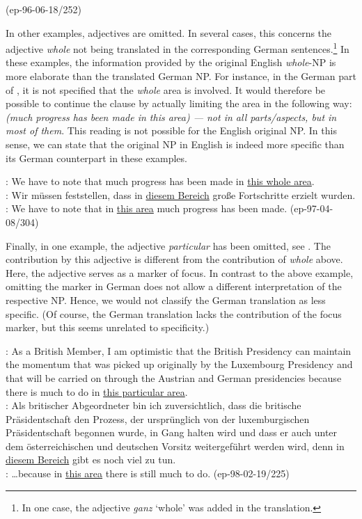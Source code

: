 \documentclass[output=paper]{LSP/langsci}
\begin{document}
(ep-96-06-18/252)
\z


In other examples, adjectives are omitted. In several cases, this concerns the adjective {\it whole} not being translated in the corresponding German sentences.\footnote{In one case, the adjective \textit{ganz} `whole' was added in the translation.} %
In these examples, the information provided by the original English \textit{whole}-NP is more elaborate than the translated German NP. For instance, in the German part of , it is not specified that the \emph{whole} area is involved. It would therefore be possible to continue the clause by actually limiting the area in the following way: {\it (much progress has been made in this area) --- not in all parts/aspects, but in most of them}. This reading is not possible for the English original NP. %
In this sense, we can state that the original NP in English is indeed more specific than its German counterpart in these examples.

\ea	\label{ex:whole} %
\ENo : We have to note that much progress has been made in \ul{this whole area}.\\
\DEt : Wir m\"ussen feststellen, dass in \ul{diesem Bereich} gro\ss e Fortschritte erzielt wurden.\\
\DElit : We have to note that in \ul{this area} much progress has been made. \hfill{(ep-97-04-08/304)}
\z

Finally, in one example, the adjective {\it particular} has been omitted, see . The contribution by this adjective is different from the contribution of {\it whole} above. Here, the adjective serves as a marker of focus. In contrast to the above example, omitting the marker in German does not allow a different interpretation of the respective NP. Hence, we would not classify the German translation as less specific. (Of course, the German translation lacks the contribution of the focus marker, but this seems unrelated to specificity.)

\ea	\label{ex:particular} %
\ENo : As a British Member, I am optimistic that the British Presidency can maintain the momentum that was picked up originally by the Luxembourg Presidency and that will be carried on through the Austrian and German presidencies because there is much to do in \ul{this particular area}.\\
\DEt : Als britischer Abgeordneter bin ich zuversichtlich, dass die britische Pr\"asidentschaft den Prozess, der urspr\"unglich von der luxemburgischen Pr\"asidentschaft begonnen wurde, in Gang halten wird und dass er auch unter dem \"osterreichischen und deutschen Vorsitz weitergef\"uhrt werden wird, denn in \ul{diesem Bereich} gibt es noch viel zu tun. \\
\DElit : \dots because in \ul{this area} there is still much to do. \hfill{(ep-98-02-19/225)}
\z
\end{document}
